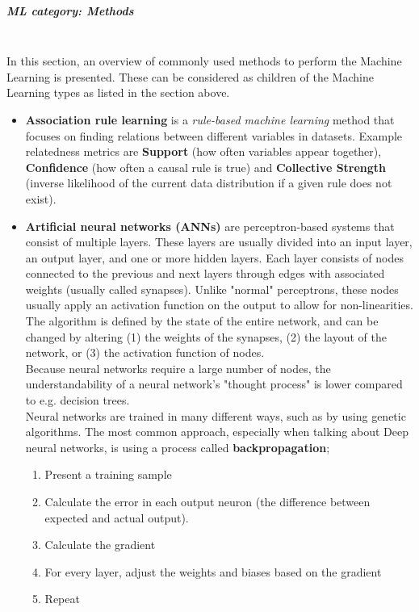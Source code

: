 \subparagraph{ML category: Methods}\mbox{}\\
In this section, an overview of commonly used methods to perform the Machine Learning is presented. These can be considered as children of the Machine Learning types as listed in the section above.\cite{preeti2017review}
\begin{itemize}
	\item \textbf{Association rule learning}
		is a \textit{rule-based machine learning} method that focuses on finding relations between different variables in datasets. Example relatedness metrics are \textbf{Support} (how often variables appear together), \textbf{Confidence} (how often a causal rule is true) and \textbf{Collective Strength} (inverse likelihood of the current data distribution if a given rule does not exist).
	\item \textbf{Artificial neural networks (ANNs)}
		are perceptron-based systems that consist of multiple layers. These layers are usually divided into an input layer, an output layer, and one or more hidden layers. Each layer consists of nodes connected to the previous and next layers through edges with associated weights (usually called synapses). Unlike "normal" perceptrons, these nodes usually apply an activation function on the output to allow for non-linearities.\\
		The algorithm is defined by the state of the entire network, and can be changed by altering (1) the weights of the synapses, (2) the layout of the network, or (3) the activation function of nodes.\\
		Because neural networks require a large number of nodes, the understandability of a neural network's "thought process" is lower compared to e.g. decision trees.\\
		Neural networks are trained in many different ways, such as by using genetic algorithms. The most common approach, especially when talking about Deep neural networks, is using a process called \textbf{backpropagation};
		\begin{enumerate}
			\item Present a training sample
			\item Calculate the error in each output neuron (the difference between expected and actual output).
			\item Calculate the gradient
			\item For every layer, adjust the weights and biases based on the gradient
			\item Repeat
		\end{enumerate}

\end{itemize}
